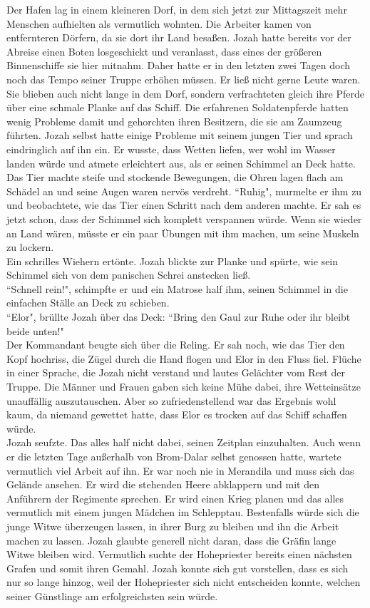 Der Hafen lag in einem kleineren Dorf, in dem sich jetzt zur Mittagszeit mehr Menschen aufhielten 
als vermutlich wohnten. Die Arbeiter kamen von entfernteren Dörfern, da sie dort ihr Land besaßen. 
Jozah hatte bereits vor der Abreise einen Boten losgeschickt und veranlasst, dass eines der 
größeren Binnenschiffe sie hier mitnahm. Daher hatte er in den letzten zwei Tagen doch noch das 
Tempo seiner Truppe erhöhen müssen. Er ließ nicht gerne Leute waren. \\
Sie blieben auch nicht lange in dem Dorf, sondern verfrachteten gleich ihre Pferde über eine 
schmale Planke auf das Schiff. Die erfahrenen Soldatenpferde hatten wenig Probleme damit und 
gehorchten ihren Besitzern, die sie am Zaumzeug führten. Jozah selbst hatte einige Probleme mit 
seinem jungen Tier und sprach eindringlich auf ihn ein. Er wusste, dass Wetten liefen, wer wohl im 
Wasser landen würde und atmete erleichtert aus, als er seinen Schimmel an Deck hatte. Das Tier 
machte steife und stockende Bewegungen, die Ohren lagen flach am Schädel an und seine Augen waren 
nervös verdreht. 
``Ruhig", murmelte er ihm zu und beobachtete, wie das Tier einen Schritt nach dem anderen machte. 
Er sah es jetzt schon, dass der Schimmel sich komplett verspannen würde. Wenn sie wieder an Land 
wären, müsste er ein paar Übungen mit ihm machen, um seine Muskeln zu lockern. \\
Ein schrilles Wiehern ertönte. Jozah blickte zur Planke und spürte, wie sein Schimmel sich von dem 
panischen Schrei anstecken ließ. \\
``Schnell rein!", schimpfte er und ein Matrose half ihm, seinen Schimmel in die einfachen Ställe an 
Deck zu schieben.\\
``Elor", brüllte Jozah über das Deck: ``Bring den Gaul zur Ruhe oder ihr bleibt beide unten!"\\
Der Kommandant beugte sich über die Reling. Er sah noch, wie das Tier den Kopf hochriss, die Zügel 
durch die Hand flogen und Elor in den Fluss fiel. Flüche in einer Sprache, die Jozah nicht verstand 
und lautes Gelächter vom Rest der Truppe. Die Männer und Frauen gaben sich keine Mühe dabei, ihre 
Wetteinsätze unauffällig auszutauschen. Aber so zufriedenstellend war das Ergebnis wohl kaum, da 
niemand gewettet hatte, dass Elor es trocken auf das Schiff schaffen würde. \\
Jozah seufzte. Das alles half nicht dabei, seinen Zeitplan einzuhalten. Auch wenn er die letzten 
Tage außerhalb von Brom-Dalar selbst genossen hatte, wartete vermutlich viel Arbeit auf ihn. Er war 
noch nie in Merandila und muss sich das Gelände ansehen. Er wird die stehenden Heere abklappern und 
mit den Anführern der Regimente sprechen. Er wird einen Krieg planen und das alles vermutlich mit 
einem jungen Mädchen im Schlepptau. Bestenfalls würde sich die junge Witwe überzeugen lassen, in 
ihrer Burg zu bleiben und ihn die Arbeit machen zu lassen. Jozah glaubte generell nicht daran, dass 
die Gräfin lange Witwe bleiben wird. Vermutlich suchte der Hohepriester bereits einen nächsten 
Grafen und somit ihren Gemahl. Jozah konnte sich gut vorstellen, dass es sich nur so lange hinzog, 
weil der Hohepriester sich nicht entscheiden konnte, welchen seiner Günstlinge am erfolgreichsten 
sein würde.


